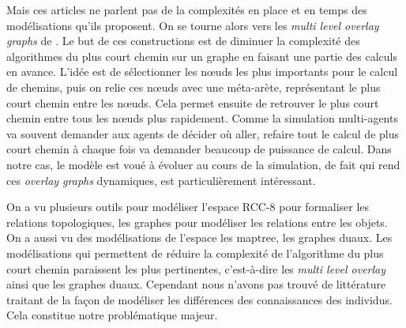 \documentclass[a4paper]{article}
\begin{document}
Mais ces articles ne parlent pas de la complexités en place et en temps des
modélisations qu'ils proposent. On se tourne alors vers les \emph{multi level
overlay graphs} de \cite{holzer2009}. Le but de ces constructions est de
diminuer la complexité des algorithmes du plus court chemin sur un graphe en
faisant une partie des calculs en avance. L'idée est de sélectionner les nœuds
les plus importants pour le calcul de chemins, puis on relie ces nœuds avec une
méta-arète, représentant le plus court chemin entre les nœuds. Cela permet
ensuite de retrouver le plus court chemin entre tous les nœuds plus rapidement.
Comme la simulation multi-agents va souvent demander aux agents de décider où
aller, refaire tout le calcul de plus court chemin à chaque fois va demander
beaucoup de puissance de calcul. Dans notre cas, le modèle est voué à évoluer au
cours de la simulation, de fait \cite{bruera2008} qui rend ces \emph{overlay
graphs} dynamiques, est particulièrement intéressant.

On a vu plusieurs outils pour modéliser l'espace RCC-8 pour formaliser les
relations topologiques, les graphes pour modéliser les relations entre les
objets. On a aussi vu des modélisations de l'espace les maptree, les graphes
duaux. Les modélisations qui permettent de réduire la complexité de l'algorithme
du plus court chemin paraissent les plus pertinentes, c'est-à-dire les
\emph{multi level overlay} ainsi que les graphes duaux. Cependant nous n'avons
pas trouvé de littérature traitant de la façon de modéliser les différences des
connaissances des individus. Cela constitue notre problématique majeur.

 
\end{document}
